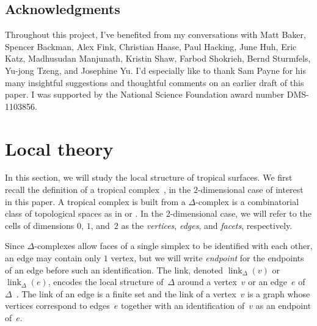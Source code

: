\documentclass[11pt]{amsart}
\theoremstyle{definition}
\newcommand{\defi}[1]{\emph{#1}}
\newcommand{\link}{\operatorname{link}}
\begin{document}
\subsection*{Acknowledgments}

Throughout this project, I've benefited from my conversations with Matt Baker,
Spencer Backman, Alex Fink, Christian Haase, Paul Hacking, June Huh, Eric Katz,
Madhusudan Manjunath, Kristin Shaw, Farbod Shokrieh, Bernd Sturmfels, Yu-jong
Tzeng, and Josephine Yu. I'd especially like to thank Sam Payne for his many
insightful suggestions and thoughtful comments on an earlier draft of this
paper. I was supported by the National Science Foundation award number
DMS-1103856.

\section{Local theory}\label{sec:local}

In this section, we will study the local structure of tropical surfaces. We
first recall the definition of a tropical complex~\cite[Sec.~2]{cartwright-complexes}, in the $2$-dimensional case of interest in
this paper. A tropical complex is built from a $\Delta$-complex is a
combinatorial class of topological spaces as in \cite[Sec.~2.1]{hatcher} or
\cite[Def.~2.44]{kozlov}. In the 2-dimensional case, we will refer to the cells
of dimensions $0$, $1$, and~$2$ as the \defi{vertices},
\defi{edges}, and \defi{facets}, respectively.

Since $\Delta$-complexes allow faces of
a single simplex to be identified with each other, an edge may contain only $1$
vertex, but we will write \defi{endpoint} for the endpoints of an edge before
such an identification. The link, denoted $\link_\Delta(v)$ or
$\link_\Delta(e)$, encodes the local structure of~$\Delta$ around a vertex~$v$
or an edge~$e$ of~$\Delta$~\cite[p. 31]{kozlov}. The link of an edge is a finite set and the link of
a vertex~$v$ is a graph whose vertices correspond to edges~$e$ together with an
identification of~$v$ as an endpoint of~$e$.
\end{document}
